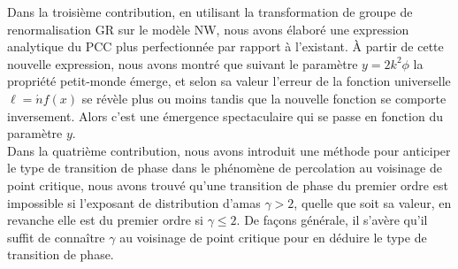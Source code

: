 Dans la troisième contribution, en utilisant la transformation de groupe de renormalisation GR sur le modèle NW, nous avons élaboré une expression analytique du PCC plus perfectionnée par rapport à l'existant. \`{A} partir de cette nouvelle expression, nous avons montré  que suivant le paramètre $y=2k^2\phi$ la propriété petit-monde émerge, et selon sa valeur l'erreur de la fonction universelle $\ell=\acute{n}f(x)$ se révèle plus ou moins tandis que la nouvelle fonction se comporte inversement. Alors c'est une émergence spectaculaire qui se passe en fonction du paramètre $y$.\\

Dans la quatrième contribution, nous avons introduit une méthode pour anticiper  le type de transition de phase dans le phénomène de percolation au voisinage de point critique, nous avons trouvé qu'une transition de phase du premier ordre est impossible si l'exposant de distribution d'amas $\gamma>2$, quelle que soit sa valeur, en revanche elle est du premier ordre si $\gamma\leq2$. De façons générale, il s'avère qu'il suffit de connaître $\gamma$ au voisinage de point critique pour en déduire le type de transition de phase.\\  
